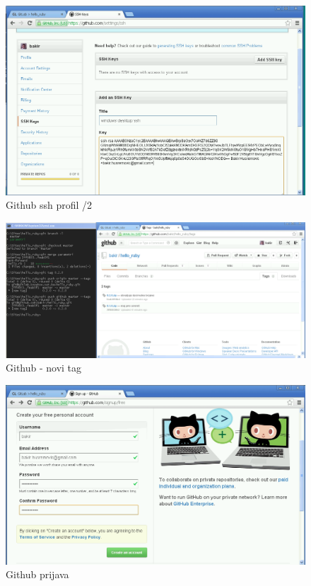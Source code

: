 \documentclass[times, utf8, seminar]{fit}
\begin{document}
\begin{figure}[H]
\centering
\includegraphics[width=15cm]{img/github_ssh_profile.png}
\caption{Github ssh profil /2}
\end{figure}

\begin{figure}[H]
\centering
\includegraphics[width=16cm]{img/github_new_tag.png}
\caption{Github - novi tag}
\end{figure}

\begin{figure}[H]
\centering
\includegraphics[width=15cm]{img/github_prijava.png}
\caption{Github prijava}
\end{figure}
\end{document}
